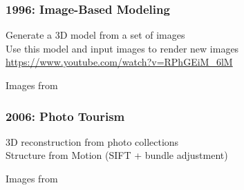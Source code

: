 \documentclass[xetex,professionalfont]{beamer}
\begin{document}

\begin{frame}
\frametitle{1996: Image-Based Modeling}

Generate a 3D model from a set of images\\\medskip
Use this model and input images to render new images\\\medskip
\url{https://www.youtube.com/watch?v=RPhGEiM_6lM} %

\bigskip
\begin{center}
	{\centering Images from \cite{debevec1996}}
\end{center}

\end{frame}


\begin{frame}
\frametitle{2006: Photo Tourism}

3D reconstruction from photo collections\\\medskip
Structure from Motion (SIFT + bundle adjustment) %

\bigskip
\begin{center}
	{\centering Images from \cite{snavely2006}}
\end{center}

\end{frame}
\end{document}
